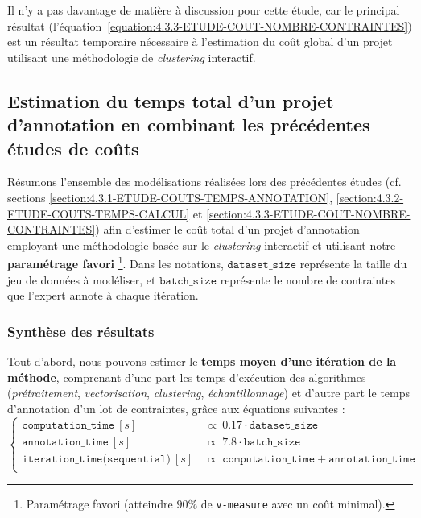 			\begin{leftBarAuthorOpinion}
				Il n'y a pas davantage de matière à discussion pour cette étude, car le principal résultat (l'équation~\ref{equation:4.3.3-ETUDE-COUT-NOMBRE-CONTRAINTES}) est un résultat temporaire nécessaire à l'estimation du coût global d'un projet utilisant une méthodologie de \textit{clustering} interactif.
			\end{leftBarAuthorOpinion}
	
	\subsection{Estimation du temps total d'un projet d'annotation en combinant les précédentes études de coûts}
	\label{section:4.3.4-ETUDE-COUTS-TOTAL}
	
		Résumons l'ensemble des modélisations réalisées lors des précédentes études (cf. sections \ref{section:4.3.1-ETUDE-COUTS-TEMPS-ANNOTATION}, \ref{section:4.3.2-ETUDE-COUTS-TEMPS-CALCUL} et \ref{section:4.3.3-ETUDE-COUT-NOMBRE-CONTRAINTES}) afin d'estimer le coût total d'un projet d'annotation employant une méthodologie basée sur le \textit{clustering} interactif et utilisant notre \textbf{paramétrage favori}
		\footnote{Paramétrage favori (atteindre $90$\% de \texttt{v-measure} avec un coût minimal).}.
		Dans les notations, $\texttt{dataset\_size}$ représente la taille du jeu de données à modéliser, et $\texttt{batch\_size}$ représente le nombre de contraintes que l'expert annote à chaque itération.

		\subsubsection{Synthèse des résultats}
			
			Tout d'abord, nous pouvons estimer le \textbf{temps moyen d'une itération de la méthode}, comprenant d'une part les temps d'exécution des algorithmes (\textit{prétraitement}, \textit{vectorisation}, \textit{clustering}, \textit{échantillonnage}) et d'autre part le temps d'annotation d'un lot de contraintes, grâce aux équations suivantes :
			\begin{equation}
				\label{equation:4.3.4-ETUDE-COUT-UNE-ITERATION-SEQUENTIELLE}
				\begin{cases}
					\texttt{computation\_time}~[s]&
						~\propto~0.17 \cdot \texttt{dataset\_size}\\
					\texttt{annotation\_time}~[s]&
						~\propto~7.8 \cdot \texttt{batch\_size} \\
					\texttt{iteration\_time(sequential)}~[s]&
						~\propto~\texttt{computation\_time} + \texttt{annotation\_time} \\
				\end{cases}
			\end{equation}
			
